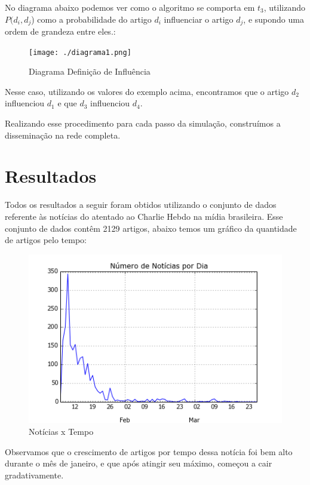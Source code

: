 \documentclass[a4paper,12pt]{article}
\begin{document}
  No diagrama abaixo podemos ver como o algoritmo se comporta em $t_{3}$, utilizando $P(d_{i},d_{j}$) como a probabilidade do artigo
  $d_{i}$ influenciar o artigo $d_{j}$, e supondo uma ordem de grandeza entre eles.:
  
  \begin{figure}[h]
    \centering
    \texttt{[image: ./diagrama1.png]}
    \caption{Diagrama Definição de Influência}
  \end{figure}

  Nesse caso, utilizando os valores do exemplo acima, encontramos que o artigo $d_{2}$ influenciou $d_{1}$ e que $d_{3}$ influenciou
  $d_{4}$.
  
  Realizando esse procedimento para cada passo da simulação, construímos a disseminação na rede completa.

  
\pagebreak  
\section{Resultados}
 
Todos os resultados a seguir foram obtidos utilizando o conjunto de dados referente às notícias do atentado ao Charlie Hebdo na mídia
brasileira. 
Esse conjunto de dados contêm 2129 artigos, abaixo temos um gráfico da quantidade de artigos pelo tempo:

\begin{figure}[h]
 \centering
 \includegraphics[scale=0.7]{./grafic.png}
 \caption{Notícias x Tempo}
\end{figure}

Observamos que o crescimento de artigos por tempo dessa notícia foi bem alto durante o mês de janeiro, e que após atingir seu máximo, começou
a cair gradativamente.
\end{document}
